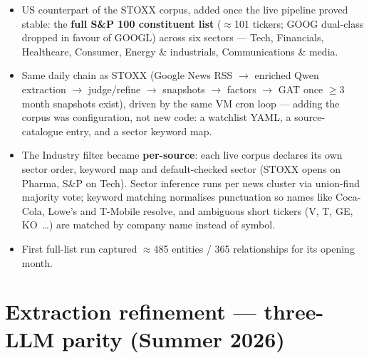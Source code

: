 \documentclass[11pt]{article}
\begin{document}
\begin{itemize}
  \item US counterpart of the STOXX corpus, added once the live pipeline proved stable: the \textbf{full S\&P 100 constituent list} (\(\approx\)101 tickers; GOOG dual-class dropped in favour of GOOGL) across six sectors --- Tech, Financials, Healthcare, Consumer, Energy \& industrials, Communications \& media.
  \item Same daily chain as STOXX (Google News RSS \(\to\) enriched Qwen extraction \(\to\) judge/refine \(\to\) snapshots \(\to\) factors \(\to\) GAT once \(\ge\)3 month snapshots exist), driven by the same VM cron loop --- adding the corpus was configuration, not new code: a watchlist YAML, a source-catalogue entry, and a sector keyword map.
  \item The Industry filter became \textbf{per-source}: each live corpus declares its own sector order, keyword map and default-checked sector (STOXX opens on Pharma, S\&P on Tech). Sector inference runs per news cluster via union-find majority vote; keyword matching normalises punctuation so names like Coca-Cola, Lowe's and T-Mobile resolve, and ambiguous short tickers (V, T, GE, KO~\ldots) are matched by company name instead of symbol.
  \item First full-list run captured \(\approx\)485 entities / 365 relationships for its opening month.
\end{itemize}

\section{Extraction refinement --- three-LLM parity (Summer 2026)}
\label{sec:refinement}
\end{document}
